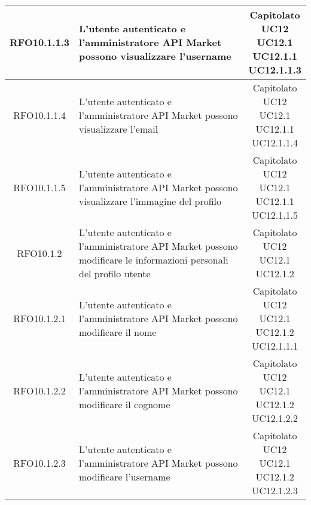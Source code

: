 \begin{longtable}{|c|p{8cm}|c|}
\hypertarget{RFO10.1.1.3}{RFO10.1.1.3} &  L'utente autenticato e l'amministratore API Market possono visualizzare l'username & \makecell*{Capitolato\\UC12\\UC12.1\\UC12.1.1\\UC12.1.1.3} \\
\hline

\hypertarget{RFO10.1.1.4}{RFO10.1.1.4} &  L'utente autenticato e l'amministratore API Market possono visualizzare l'email & \makecell*{Capitolato\\UC12\\UC12.1\\UC12.1.1\\UC12.1.1.4} \\
\hline

\hypertarget{RFO10.1.1.5}{RFO10.1.1.5} &  L'utente autenticato e l'amministratore API Market possono visualizzare l'immagine del profilo & \makecell*{Capitolato\\UC12\\UC12.1\\UC12.1.1\\UC12.1.1.5} \\
\hline

\hypertarget{RFO10.1.2}{RFO10.1.2} &  L'utente autenticato e l'amministratore API Market possono modificare le informazioni personali del profilo utente &\makecell*{Capitolato\\UC12\\UC12.1\\UC12.1.2} \\
\hline

\hypertarget{RFO10.1.2.1}{RFO10.1.2.1} &  L'utente autenticato e l'amministratore API Market possono modificare il nome & \makecell*{Capitolato\\UC12\\UC12.1\\UC12.1.2\\UC12.1.1.1} \\
\hline

\hypertarget{RFO10.1.2.2}{RFO10.1.2.2} &  L'utente autenticato e l'amministratore API Market possono modificare il cognome & \makecell*{Capitolato\\UC12\\UC12.1\\UC12.1.2\\UC12.1.2.2} \\
\hline

\hypertarget{RFO10.1.2.3}{RFO10.1.2.3} &  L'utente autenticato e l'amministratore API Market possono modificare l'username & \makecell*{Capitolato\\UC12\\UC12.1\\UC12.1.2\\UC12.1.2.3} \\
\hline


\end{longtable}
